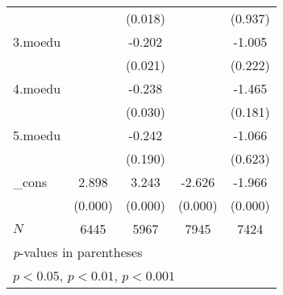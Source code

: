 {\begin{tabular}{l*{4}{c}}
            &                     &     (0.018)         &                     &     (0.937)         \\
[1em]
3.moedu     &                     &      -0.202\sym{*}  &                     &      -1.005         \\
            &                     &     (0.021)         &                     &     (0.222)         \\
[1em]
4.moedu     &                     &      -0.238\sym{*}  &                     &      -1.465         \\
            &                     &     (0.030)         &                     &     (0.181)         \\
[1em]
5.moedu     &                     &      -0.242         &                     &      -1.066         \\
            &                     &     (0.190)         &                     &     (0.623)         \\
[1em]
\_cons      &       2.898\sym{***}&       3.243\sym{***}&      -2.626\sym{***}&      -1.966\sym{***}\\
            &     (0.000)         &     (0.000)         &     (0.000)         &     (0.000)         \\
\hline
\(N\)       &        6445         &        5967         &        7945         &        7424         \\
\hline\hline
\multicolumn{5}{l}{\footnotesize \textit{p}-values in parentheses}\\
\multicolumn{5}{l}{\footnotesize \sym{*} \(p<0.05\), \sym{**} \(p<0.01\), \sym{***} \(p<0.001\)}\\
\end{tabular}
}
